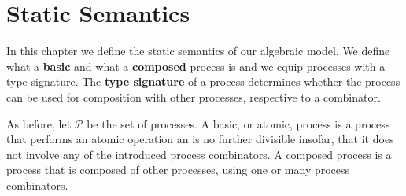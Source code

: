 





\section{Static Semantics}
\label{chp:static_semantics}
In this chapter we define the static semantics of our algebraic model. We define what a \textbf{basic} and what a \textbf{composed} process is and we equip processes with a type signature. The \textbf{type signature} of a process determines whether the process can be used for composition with other processes, respective to a combinator.

As before, let $\mathcal{P}$ be the set of processes. A basic, or atomic, process is a process that performs an atomic operation an is no further divisible insofar, that it does not involve any of the introduced process combinators. A composed process is a process that is composed of other processes, using one or many process combinators.

